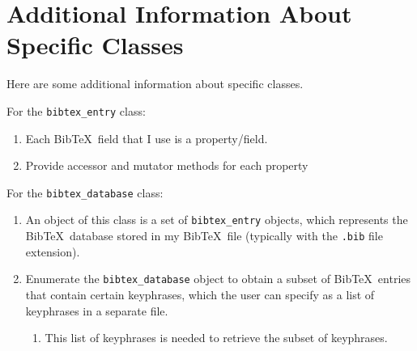 \section{Additional Information About Specific Classes}
\label{sec:AdditionalInformationAboutSpecificClasses}

Here are some additional information about specific classes.

For the {\tt bibtex\_entry} class: \vspace{-0.3cm}
\begin{enumerate} \itemsep -4pt
\item Each {\sc Bib}\TeX\ field that I use is a property/field.
\item Provide accessor and mutator methods for each property
\end{enumerate}



For the {\tt bibtex\_database} class: \vspace{-0.3cm}
\begin{enumerate} \itemsep -4pt
\item An object of this class is a set of {\tt bibtex\_entry} objects, which represents the {\sc Bib}\TeX\ database stored in my {\sc Bib}\TeX\ file (typically with the {\tt .bib} file extension).
\item Enumerate the {\tt bibtex\_database} object to obtain a subset of {\sc Bib}\TeX\ entries that contain certain keyphrases, which the user can specify as a list of keyphrases in a separate file. \vspace{-0.3cm}
	\begin{enumerate} \itemsep -2pt
	\item This list of keyphrases is needed to retrieve the subset of keyphrases.
	\end{enumerate}
\end{enumerate}





























